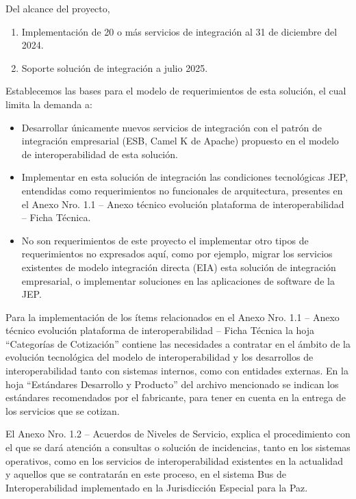 \documentclass[
  paper=a4,
  ,captions=tableheading
]{scrartcl}
\providecommand{\tightlist}{%
  \setlength{\itemsep}{0pt}\setlength{\parskip}{0pt}}
\begin{document}
Del alcance del proyecto,

\begin{enumerate}
\def\labelenumi{\arabic{enumi}.}
\tightlist
\item
  Implementación de 20 o más servicios de integración al 31 de diciembre
  del 2024.
\item
  Soporte solución de integración a julio 2025.
\end{enumerate}

Establecemos las bases para el modelo de requerimientos de esta
solución, el cual limita la demanda a:

\begin{itemize}
\tightlist
\item
  Desarrollar únicamente nuevos servicios de integración con el patrón
  de integración empresarial (ESB, Camel K de Apache) propuesto en el
  modelo de interoperabilidad de esta solución.
\item
  Implementar en esta solución de integración las condiciones
  tecnológicas JEP, entendidas como requerimientos no funcionales de
  arquitectura, presentes en el Anexo Nro. 1.1 -- Anexo técnico
  evolución plataforma de interoperabilidad -- Ficha Técnica.
\item
  No son requerimientos de este proyecto el implementar otro tipos de
  requerimientos no expresados aquí, como por ejemplo, migrar los
  servicios existentes de modelo integración directa (EIA) esta solución
  de integración empresarial, o implementar soluciones en las
  aplicaciones de software de la JEP.
\end{itemize}

Para la implementación de los ítems relacionados en el Anexo Nro. 1.1 --
Anexo técnico evolución plataforma de interoperabilidad -- Ficha Técnica
la hoja ``Categorías de Cotización'' contiene las necesidades a
contratar en el ámbito de la evolución tecnológica del modelo de
interoperabilidad y los desarrollos de interoperabilidad tanto con
sistemas internos, como con entidades externas. En la hoja ``Estándares
Desarrollo y Producto'' del archivo mencionado se indican los estándares
recomendados por el fabricante, para tener en cuenta en la entrega de
los servicios que se cotizan.

El Anexo Nro. 1.2 -- Acuerdos de Niveles de Servicio, explica el
procedimiento con el que se dará atención a consultas o solución de
incidencias, tanto en los sistemas operativos, como en los servicios de
interoperabilidad existentes en la actualidad y aquellos que se
contratarán en este proceso, en el sistema Bus de Interoperabilidad
implementado en la Jurisdicción Especial para la Paz.
\end{document}
